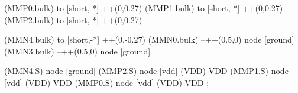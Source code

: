 \begin{circuitikz}[american]
	(MMP0.bulk) to [short,-*] ++(0,0.27)
	(MMP1.bulk) to [short,-*] ++(0,0.27)
	(MMP2.bulk) to [short,-*] ++(0,0.27)
	
	(MMN4.bulk) to [short,-*] ++(0,-0.27)
	(MMN0.bulk) --++(0.5,0) node [ground] {}
	(MMN3.bulk) --++(0.5,0) node [ground] {}
	

	(MMN4.S) node [ground] {}
	(MMP2.S) node [vdd] (VDD) {VDD}
	(MMP1.S) node [vdd] (VDD) {VDD}
	(MMP0.S) node [vdd] (VDD) {VDD}
;

\end{circuitikz}
